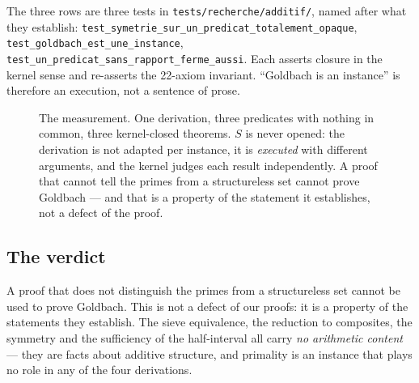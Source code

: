 \documentclass[11pt]{article}
\theoremstyle{remark}\newtheorem{remark}{Remark}
\begin{document}
The three rows are three tests in \texttt{tests/recherche/additif/}, named after what
they establish: \texttt{test\_symetrie\_sur\_un\_predicat\_totalement\_opaque},
\texttt{test\_goldbach\_est\_une\_instance},
\texttt{test\_un\_predicat\_sans\_rapport\_ferme\_aussi}. Each asserts closure in the
kernel sense and re-asserts the 22-axiom invariant. ``Goldbach is an instance'' is
therefore an execution, not a sentence of prose.

\begin{figure}[t]
\centering
{}
\caption{The measurement. One derivation, three predicates with nothing in common,
three kernel-closed theorems. $S$ is never opened: the derivation is not adapted per
instance, it is \emph{executed} with different arguments, and the kernel judges each
result independently. A proof that cannot tell the primes from a structureless set
cannot prove Goldbach --- and that is a property of the statement it establishes, not a
defect of the proof.}
\label{fig:parametric}
\end{figure}

\subsection{The verdict}

A proof that does not distinguish the primes from a structureless set cannot be used to
prove Goldbach. This is not a defect of our proofs: it is a property of the statements
they establish. The sieve equivalence, the reduction to composites, the symmetry and
the sufficiency of the half-interval all carry \emph{no arithmetic content} --- they are
facts about additive structure, and primality is an instance that plays no role in any
of the four derivations.
\end{document}
